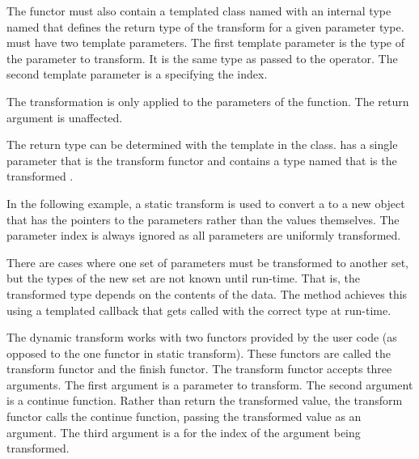 The functor must also contain a templated class named 
with an internal type named  that defines the return type of
the transform for a given parameter type.  must have
two template parameters. The first template parameter is the type of the
 parameter to transform. It is the same
type as passed to the operator. The second template parameter is a
 specifying the index.

The transformation is only applied to the parameters of the function. The
return argument is unaffected.

The return type can be determined with the 
template in the 
class.  has a single parameter that is the
transform functor and contains a type named  that is the
transformed .

In the following example, a static transform is used to convert a
 to a new object that has the pointers to
the parameters rather than the values themselves. The parameter index is
always ignored as all parameters are uniformly transformed.




There are cases where one set of parameters must be transformed to another
set, but the types of the new set are not known until run-time. That is,
the transformed type depends on the contents of the data. The
 method achieves this using a templated
callback that gets called with the correct type at run-time.

The dynamic transform works with two functors provided by the user code (as
opposed to the one functor in static transform). These functors are called
the transform functor and the finish functor. The transform functor accepts
three arguments. The first argument is a parameter to transform. The second
argument is a continue function. Rather than return the transformed value,
the transform functor calls the continue function, passing the transformed
value as an argument. The third argument is a  for
the index of the argument being transformed.

